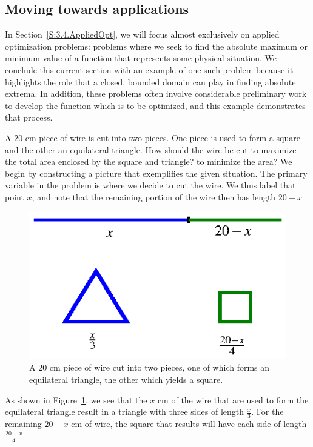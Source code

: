 \subsection*{Moving towards applications}

In Section~\ref{S:3.4.AppliedOpt}, we will focus almost exclusively on applied optimization problems:  problems where we seek to find the absolute maximum or minimum value of a function that represents some physical situation.  We conclude this current section with an example of one such problem because it highlights the role that a closed, bounded domain can play in finding absolute extrema.  In addition, these problems often involve considerable preliminary work to develop the function which is to be optimized, and this example demonstrates that process.

\bex \label{Ex:3.3.1}
A 20 cm piece of wire is cut into two pieces.  One piece is used to form a square and the other an equilateral triangle.  How should the wire be cut to maximize the total area enclosed by the square and triangle?  to minimize the area?
\eex
We begin by constructing a picture that exemplifies the given situation.  The primary variable in the problem is where we decide to cut the wire.  We thus label that point $x$, and note that the remaining portion of the wire then has length $20-x$
\begin{figure}[h]
\begin{center}
\includegraphics{figures/3_3_Ex1.eps} 
\caption{A 20 cm piece of wire cut into two pieces, one of which forms an equilateral triangle, the other which yields a square.} \label{F:3.3.Ex1}
\end{center}
\end{figure}
As shown in Figure~\ref{F:3.3.Ex1}, we see that the $x$ cm of the wire that are used to form the equilateral triangle result in a triangle with three sides of length $\frac{x}{3}$.  For the remaining $20-x$ cm of wire, the square that results will have each side of length $\frac{20-x}{4}$.

